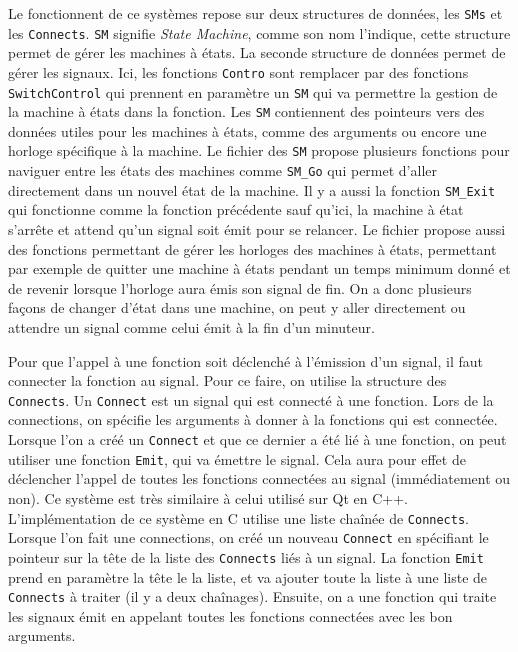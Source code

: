 \documentclass[a4paper]{article}
\begin{document}
Le fonctionnent de ce systèmes repose sur deux structures de données, les
\verb|SMs| et les \verb|Connects|. \verb|SM| signifie \textit{State Machine},
comme son nom l'indique, cette structure permet de gérer les machines à états.
La seconde structure de données permet de gérer les signaux. Ici, les fonctions
\verb|Contro| sont remplacer par des fonctions \verb|SwitchControl| qui prennent
en paramètre un \verb|SM| qui va permettre la gestion de la machine à états dans
la fonction. Les \verb|SM| contiennent des pointeurs vers des données utiles
pour les machines à états, comme des arguments ou encore une horloge spécifique
à la machine. Le fichier des \verb|SM| propose plusieurs fonctions pour naviguer
entre les états des machines comme \verb|SM_Go| qui permet d'aller directement
dans un nouvel état de la machine. Il y a aussi la fonction \verb|SM_Exit| qui
fonctionne comme la fonction précédente sauf qu'ici, la machine à état s'arrête
et attend qu'un signal soit émit pour se relancer. Le fichier propose aussi des
fonctions permettant de gérer les horloges des machines à états, permettant par
exemple de quitter une machine à états pendant un temps minimum donné et de
revenir lorsque l'horloge aura émis son signal de fin. On a donc plusieurs
façons de changer d'état dans une machine, on peut y aller directement ou
attendre un signal comme celui émit à la fin d'un minuteur.

Pour que l'appel à une fonction soit déclenché à l'émission d'un signal, il faut
connecter la fonction au signal. Pour ce faire, on utilise la structure des
\verb|Connects|. Un \verb|Connect| est un signal qui est connecté à une
fonction. Lors de la connections, on spécifie les arguments à donner à la
fonctions qui est connectée. Lorsque l'on a créé un \verb|Connect| et que ce
dernier a été lié à une fonction, on peut utiliser une fonction \verb|Emit|, qui
va émettre le signal. Cela aura pour effet de déclencher l'appel de toutes les
fonctions connectées au signal (immédiatement ou non). Ce système est très
similaire à celui utilisé sur Qt en C++. L'implémentation de ce système en C
utilise une liste chaînée de \verb|Connects|. Lorsque l'on fait une connections,
on créé un nouveau \verb|Connect| en spécifiant le pointeur sur la tête de la
liste des \verb|Connects| liés à un signal. La fonction \verb|Emit| prend en
paramètre la tête le la liste, et va ajouter toute la liste à une liste de
\verb|Connects| à traiter (il y a deux chaînages). Ensuite, on a une fonction
qui traite les signaux émit en appelant toutes les fonctions connectées avec les
bon arguments.
\end{document}
